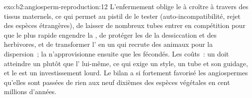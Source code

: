 \begin{solution}{exo:b2:angiosperm-reproduction:12}
L'enfermement oblige le  à croître à travers des tissus maternels,
ce qui permet au pistil de le tester (auto-incompatibilité, rejet des
espèces étrangères), de laisser de nombreux tubes entrer en compétition
pour que le plus rapide engendre la , de protéger les  de la
dessiccation et des herbivores, et de transformer l' en un 
qui recrute des animaux pour la dispersion~; la 
n'approvisionne ensuite que les  fécondés. Les coûts~: un  doit atteindre un  plutôt que l' lui-même, ce qui
exige un style, un tube et son guidage, et le  est un
investissement lourd. Le bilan a si fortement favorisé les angiospermes
qu'elles sont passées de rien aux neuf dixièmes des espèces végétales en
cent millions d'années.
\end{solution}

